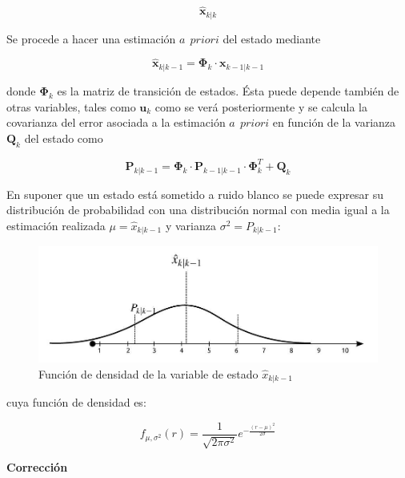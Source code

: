 \documentclass[twoside,11pt]{book}
\begin{document}
\begin{equation}
\hat{\mathbf{x}}_{k|k}
\end{equation}

Se procede a hacer una estimación $a \>\> priori$ del estado mediante

\begin{equation}
\hat{\mathbf{x}}_{k|k-1} =\mathbf{\Phi}_{k} \cdot \mathbf{x}_{k-1|k-1}
\end{equation}

donde $\mathbf{\Phi}_{k}$ es la matriz de transición de estados. Ésta puede depende también de otras variables, tales como $\mathbf{u}_{k}$ como se verá posteriormente y se calcula la covarianza del error asociada a la estimación $a \>\> priori$ en función de la varianza $\mathbf{Q}_{k}$ del estado como

\begin{equation}
\mathbf{P}_{k|k-1}=\mathbf{\Phi}_{k} \cdot \mathbf{P}_{k-1|k-1} \cdot \mathbf{\Phi}_{k}^{T} + \mathbf{Q}_{k}
\end{equation}

En suponer que un estado está sometido a ruido blanco se puede expresar su distribución de probabilidad con una distribución normal con media igual a la estimación realizada $\mu=\hat{x}_{k|k-1}$ y varianza $\sigma^{2}=P_{k|k-1}$:

\begin{figure}[h!]
\begin{center}
\includegraphics[scale=0.35,bb=0 0 800 327]{images/fun_dens_x.png}
\caption{Función de densidad de la variable de estado $\hat{x}_{k|k-1}$}
\end{center}
\end{figure}
\newpage
cuya función de densidad es:

\begin{equation}
f_{\mu,\sigma^{2}}(r)=\frac{1}{\sqrt{2\pi \sigma^{2}}}e^{-\frac{(r-\mu)^{2}}{2\sigma}}
\end{equation}		

\textbf{Corrección}\\
\end{document}
